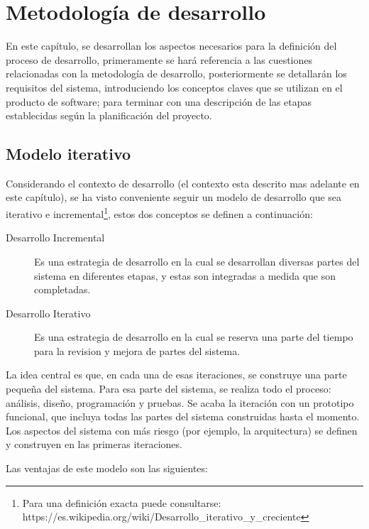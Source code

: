 \chapter{Metodología de desarrollo}

En este capítulo, se desarrollan los aspectos necesarios para la definición del 
proceso de desarrollo, primeramente se hará referencia a las cuestiones 
relacionadas con la metodología de desarrollo, posteriormente se detallarán los
requisitos del sistema, introduciendo los conceptos claves que se utilizan en el
producto de software; para terminar con una descripción de las etapas
establecidas según la planificación del proyecto.

\section{Modelo iterativo}

Considerando el contexto de desarrollo (el contexto esta descrito mas adelante
en este capítulo), se ha visto conveniente seguir un modelo de desarrollo que
sea iterativo e incremental\footnote{Para una definición exacta puede
consultarse:
https://es.wikipedia.org/wiki/Desarrollo\_iterativo\_y\_creciente}, estos dos
conceptos se definen a continuación\cite{Cockburn}:

\begin{description}
\item [Desarrollo Incremental] Es una estrategia de desarrollo en la cual se
desarrollan diversas partes del sistema en diferentes etapas, y estas son
integradas a medida que son completadas.
\item [Desarrollo Iterativo] Es una estrategia de desarrollo en la cual se
reserva una parte del tiempo para la revision y mejora de partes del sistema.
\end{description}

La idea central es que, en cada una de esas iteraciones, se construye una parte
pequeña del sistema. Para esa parte del sistema, se realiza todo el proceso:
análisis, diseño, programación y pruebas. Se acaba la iteración con un
prototipo funcional, que incluya todas las partes del sistema construidas hasta
el momento. Los aspectos del sistema con más riesgo (por ejemplo, la
arquitectura) se definen y construyen en las primeras iteraciones.

Las ventajas de este modelo son las siguientes:

